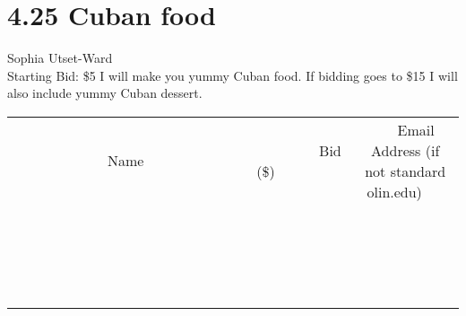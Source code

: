 \documentclass[11pt]{article}
\begin{document}
\section*{4.25 Cuban food}
Sophia Utset-Ward
\\
Starting Bid: \$5
\newline
I will make you yummy Cuban food. If bidding goes to \$15 I will also include yummy Cuban dessert.
\\[3ex]
\begin{tabular}{c c c}
~~~~~~~~~~~~~Name~~~~~~~~~~~~~ & ~~~~~~~~~Bid (\$)~~~~~~~~~  & ~~~Email Address (if not standard olin.edu)~~~\\
 & & \\
\hline
 & & \\
\hline
 & & \\
\hline
 & & \\
\hline
 & & \\
\hline
 & & \\
\hline
 & & \\
\hline
 & & \\
\hline
 & & \\
\hline
 & & \\
\hline
 & & \\
\hline
 & & \\
\hline
 & & \\
\hline
 & & \\
\hline
 & & \\
\hline
 & & \\
\hline
 & & \\
\hline
 & & \\
\hline
 & & \\
\hline
\end{tabular}
\newpage
\end{document}
